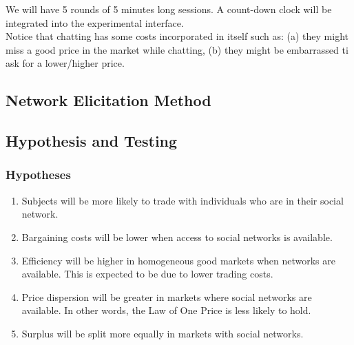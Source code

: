 \documentclass{article}
\begin{document}
We will have 5 rounds of 5 minutes long sessions. A count-down clock will be integrated into the experimental interface.\\

Notice that chatting has some costs incorporated in itself such as: (a) they might miss a good price in the market while chatting, (b) they might be embarrassed ti ask for a lower/higher price.

\subsection{Network Elicitation Method}



\subsection{Hypothesis and Testing}
\subsubsection{Hypotheses}
\begin{enumerate}[{Hypothesis} 1]
    \item Subjects will be more likely to trade with individuals who are in
        their social network.
    \item Bargaining costs will be lower when access to social networks is
        available.
    \item Efficiency will be higher in homogeneous good markets when networks
        are available. This is expected to be due to lower trading costs.
    \item Price dispersion will be greater in markets where social networks are
        available. In other words, the Law of One Price is less likely to hold.
    \item Surplus will be split more equally in markets with social networks.
\end{enumerate}
\end{document}

